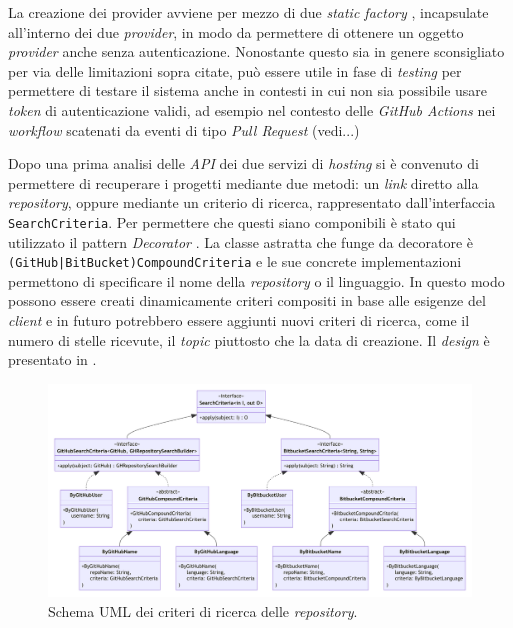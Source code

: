 La creazione dei provider avviene per mezzo di due \textit{static factory} \cite{effective-java}, incapsulate all'interno dei due \textit{provider}, in modo da permettere di ottenere un oggetto \textit{provider} anche senza autenticazione.
%
Nonostante questo sia in genere sconsigliato per via delle limitazioni sopra citate, può essere utile in fase di \textit{testing} per permettere di testare il sistema anche in contesti in cui non sia possibile usare \textit{token} di autenticazione validi, ad esempio nel contesto delle \textit{GitHub Actions} nei \textit{workflow} scatenati da eventi di tipo \textit{Pull Request} (vedi...)

Dopo una prima analisi delle \textit{API} dei due servizi di \textit{hosting} si è convenuto di permettere di recuperare i progetti mediante due metodi: un \textit{link} diretto alla \textit{repository}, oppure mediante un criterio di ricerca, rappresentato dall'interfaccia \texttt{SearchCriteria}.
%
Per permettere che questi siano componibili è stato qui utilizzato il pattern \textit{Decorator} \cite{gof}.
%
La classe astratta che funge da decoratore è \texttt{(GitHub|BitBucket)CompoundCriteria} e le sue concrete implementazioni permettono di specificare il nome della \textit{repository} o il linguaggio.
%
In questo modo possono essere creati dinamicamente criteri compositi in base alle esigenze del \textit{client} e in futuro potrebbero essere aggiunti nuovi criteri di ricerca, come il numero di stelle ricevute, il \textit{topic} piuttosto che la data di creazione.
%
Il \textit{design} è presentato in .

\begin{figure}
    \centering
    \includegraphics[width=\textwidth]{resources/img/02-search-criteria.pdf}
    \caption{Schema UML dei criteri di ricerca delle \textit{repository}.}
    \label{img:02-search-criteria}
\end{figure}

